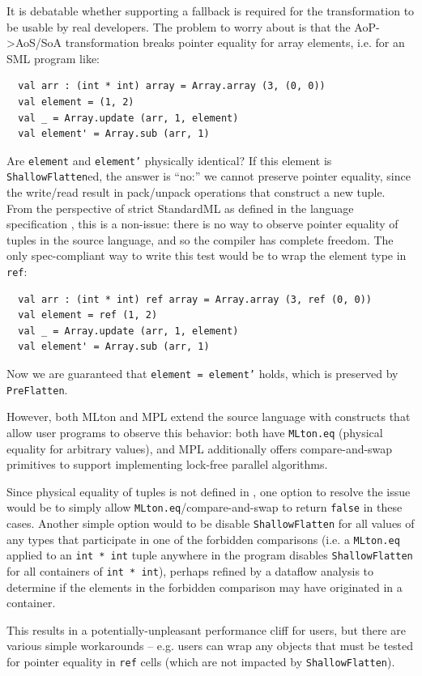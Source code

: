 \documentclass[leqno,11pt]{article}
\begin{document}
It is debatable whether supporting a fallback is required for the transformation
to be usable by real developers. The problem to worry about is that the
AoP->AoS/SoA transformation breaks pointer equality for array elements, i.e. for
an SML program like:
\begin{verbatim}
  val arr : (int * int) array = Array.array (3, (0, 0))
  val element = (1, 2)
  val _ = Array.update (arr, 1, element)
  val element' = Array.sub (arr, 1)
\end{verbatim}
Are \texttt{element} and \texttt{element'} physically identical? If this element
is \texttt{ShallowFlatten}ed, the answer is ``no:'' we cannot preserve pointer
equality, since the write/read result in pack/unpack operations that construct a
new tuple. From the perspective of strict StandardML as defined in the language
specification \cite{sml-def}, this is a non-issue: there is no way to observe
pointer equality of tuples in the source language, and so the compiler has
complete freedom. The only spec-compliant way to write this test would be to
wrap the element type in \texttt{ref}:
\begin{verbatim}
  val arr : (int * int) ref array = Array.array (3, ref (0, 0))
  val element = ref (1, 2)
  val _ = Array.update (arr, 1, element)
  val element' = Array.sub (arr, 1)
\end{verbatim}
Now we are guaranteed that \texttt{element = element'} holds, which is preserved
by \texttt{PreFlatten}.

However, both MLton and MPL extend the source language with constructs that
allow user programs to observe this behavior: both have \texttt{MLton.eq}
(physical equality for arbitrary values), and MPL additionally offers
compare-and-swap primitives to support implementing lock-free parallel
algorithms.

Since physical equality of tuples is not defined in \cite{sml-def}, one option
to resolve the issue would be to simply allow \texttt{MLton.eq}/compare-and-swap
to return \texttt{false} in these cases. Another simple option would to be
disable \texttt{ShallowFlatten} for all values of any types that participate in
one of the forbidden comparisons (i.e. a \texttt{MLton.eq} applied to an
\texttt{int * int} tuple anywhere in the program disables
\texttt{ShallowFlatten} for all containers of \texttt{int * int}), perhaps
refined by a dataflow analysis to determine if the elements in the forbidden
comparison may have originated in a container.

This results in a potentially-unpleasant performance cliff for users, but there
are various simple workarounds -- e.g. users can wrap any objects that must be
tested for pointer equality in \texttt{ref} cells (which are not impacted by
\texttt{ShallowFlatten}).
\end{document}
